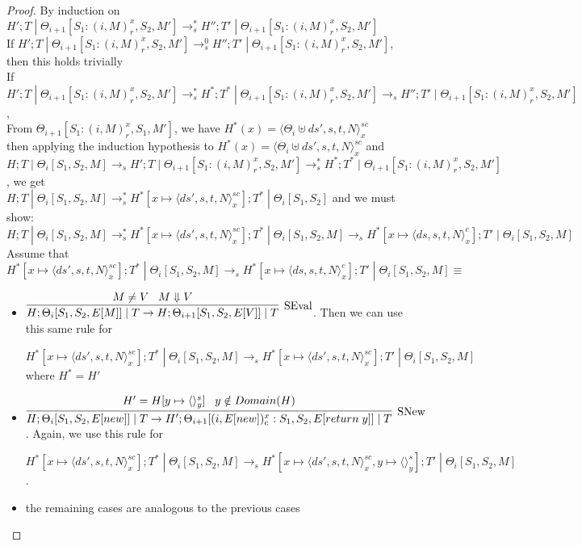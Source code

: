 \documentclass[9pt]{article}
\newcommand\specStep{\rightarrow_{s}}
\newcommand{\eval}[1]{E[#1]}
\begin{document}
\begin{proof}
By induction on $H'; T \; | \; \Theta_{i+1}[S_1 : (i, M)_r^x, S_2, M'] \specStep^* H''; T' \; | \; \Theta_{i+1}[S_1 : (i, M)_r^x, S_2, M']$ \\
If $H'; T \; | \; \Theta_{i+1}[S_1 : (i, M)_r^x, S_2, M'] \specStep^0 H''; T'\; | \; \Theta_{i+1}[S_1 : (i, M)_r^x, S_2, M']$, then this holds trivially \\
If $H'; T \; | \; \Theta_{i+1}[S_1 : (i, M)_r^x, S_2, M'] \specStep^* H^*; T^* \; | \; \Theta_{i+1}[S_1 : (i, M)_r^x, S_2, M'] \specStep H''; T' \; | \; \Theta_{i+1}[S_1 : (i, M)_r^x, S_2, M']$, \\
From $\Theta_{i+1}[S_1 : (i, M)_r^x, S_1, M']$, we have $H^*(x) = \langle \Theta_i \uplus ds', s, t, N\rangle_x^{sc}$ \\
then applying the induction hypothesis to $H^*(x) = \langle \Theta_i \uplus ds', s, t, N\rangle_x^{sc}$ and \\
$H; T \; | \; \Theta_i[S_1, S_2, M] \specStep H'; T \; | \; \Theta_{i+1}[S_1 : (i, M)_r^x, S_2, M'] \specStep^* H^*; T^* \; | \; \Theta_{i+1}[S_1 : (i, M)_r^x, S_2, M']$, we get \\
$H; T \; | \; \Theta_i[S_1, S_2, M] \specStep^* H^*[x \mapsto \langle ds', s, t, N\rangle_x^{sc}]; T^* \; | \; \Theta_i[S_1, S_2]$ and we must show: \\
$H; T \; | \; \Theta_i[S_1, S_2, M] \specStep^* H^*[x \mapsto \langle ds', s, t, N\rangle_x^{sc}]; T^* \; | \; \Theta_i[S_1, S_2, M] \specStep H^*[x \mapsto \langle ds, s, t, N\rangle_x^c]; T' \; | \; \Theta_i[S_1, S_2, M]$ \\
Assume that $H^*[x \mapsto \langle ds', s, t, N\rangle_x^{sc}]; T^* \; | \; \Theta_i[S_1, S_2, M] \specStep H^*[x \mapsto \langle ds, s, t, N\rangle_x^c]; T' \; | \; \Theta_i[S_1, S_2, M] \equiv $

\begin{itemize}
\item $\infer[\text{SEval}]{H; \Theta_i[S_1, S_2, \eval{M}] \; | \; T  \rightarrow H; \Theta_{i+1}[S_1, S_2, \eval{V}] \; | \; T}{M \neq V \;\;\; M \Downarrow V} $.  Then we can use this same rule for 

$H^*[x \mapsto \langle ds', s, t, N\rangle_x^{sc}]; T^* \; | \; \Theta_i[S_1, S_2, M] \specStep H^*[x \mapsto \langle ds', s, t, N\rangle_x^{sc}]; T' \; | \; \Theta_i[S_1, S_2, M]$ where $H^* = H'$

\item $\infer[\text{SNew}]{H; \Theta_i[S_1, S_2, \eval{new}] \; | \; T \rightarrow H';  \Theta_{i+1}[(i, \eval{new})_c^x : S_1, S_2, \eval{return \; y}] \; | \; T}{H' = H[y \mapsto \langle\rangle_y^s] \;\;\; y \notin Domain(H)}$.  Again, we use this rule for 

$H^*[x \mapsto \langle ds', s, t, N\rangle_x^{sc}]; T^* \; | \; \Theta_i[S_1, S_2, M] \specStep H^*[x \mapsto \langle ds', s, t, N\rangle_x^{sc}, y\mapsto \langle\rangle_y^s]; T' \; | \; \Theta_i[S_1, S_2, M]$.

\item the remaining cases are analogous to the previous cases
\end{itemize}
 
\end{proof}
\end{document}
